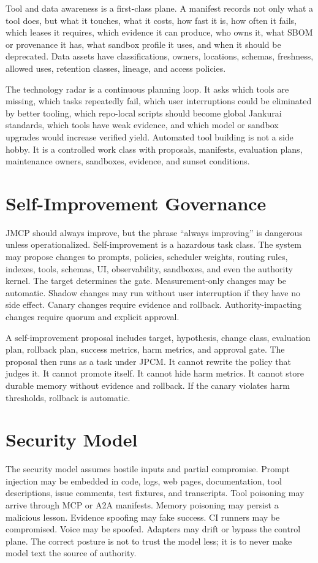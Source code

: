 \documentclass[journal,onecolumn]{IEEEtran}
\begin{document}
Tool and data awareness is a first-class plane. A manifest records not only what a tool does, but what it touches, what it costs, how fast it is, how often it fails, which leases it requires, which evidence it can produce, who owns it, what SBOM or provenance it has, what sandbox profile it uses, and when it should be deprecated. Data assets have classifications, owners, locations, schemas, freshness, allowed uses, retention classes, lineage, and access policies.

The technology radar is a continuous planning loop. It asks which tools are missing, which tasks repeatedly fail, which user interruptions could be eliminated by better tooling, which repo-local scripts should become global Jankurai standards, which tools have weak evidence, and which model or sandbox upgrades would increase verified yield. Automated tool building is not a side hobby. It is a controlled work class with proposals, manifests, evaluation plans, maintenance owners, sandboxes, evidence, and sunset conditions.

\section{Self-Improvement Governance}
JMCP should always improve, but the phrase ``always improving'' is dangerous unless operationalized. Self-improvement is a hazardous task class. The system may propose changes to prompts, policies, scheduler weights, routing rules, indexes, tools, schemas, UI, observability, sandboxes, and even the authority kernel. The target determines the gate. Measurement-only changes may be automatic. Shadow changes may run without user interruption if they have no side effect. Canary changes require evidence and rollback. Authority-impacting changes require quorum and explicit approval.

A self-improvement proposal includes target, hypothesis, change class, evaluation plan, rollback plan, success metrics, harm metrics, and approval gate. The proposal then runs as a task under JPCM. It cannot rewrite the policy that judges it. It cannot promote itself. It cannot hide harm metrics. It cannot store durable memory without evidence and rollback. If the canary violates harm thresholds, rollback is automatic.

\section{Security Model}
The security model assumes hostile inputs and partial compromise. Prompt injection may be embedded in code, logs, web pages, documentation, tool descriptions, issue comments, test fixtures, and transcripts. Tool poisoning may arrive through MCP or A2A manifests. Memory poisoning may persist a malicious lesson. Evidence spoofing may fake success. CI runners may be compromised. Voice may be spoofed. Adapters may drift or bypass the control plane. The correct posture is not to trust the model less; it is to never make model text the source of authority.
\end{document}

